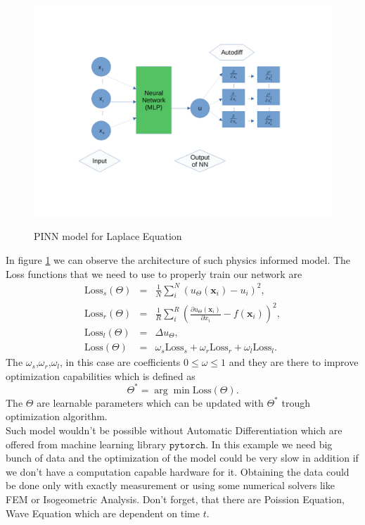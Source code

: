 \begin{figure}[h!]
	\includegraphics[width=15cm]{chapters/chapter1/pinn}
	\label{pinn}
	\caption{PINN model for Laplace Equation}
\end{figure}
In figure \ref{pinn} we can observe the architecture of such physics informed model. 
The Loss functions that we need to use to properly train our network are
\begin{eqnarray}
	\text{Loss}_s(\Theta) &=& \frac{1}{N}\sum^N_i\left(u_{\Theta}(\mathbf{x}_i)- u_i\right)^2,\\
	\text{Loss}_r(\Theta) &=& \frac{1}{R}\sum^R_i\left(\frac{\partial u_{\Theta}(\mathbf{x}_i)}{\partial x_i} - f(\mathbf{x}_i)\right)^2,\\
	\text{Loss}_l(\Theta) &=& \Delta u_{\Theta},\\
	\text{Loss}(\Theta) &=& \omega_s \text{Loss}_s +\omega_r \text{Loss}_r +\omega_l \text{Loss}_l .
\end{eqnarray}
The $\omega_s$,$\omega_r$,$\omega_l$, in this case are coefficients $0\leq \omega \leq 1$ and they are there to improve optimization capabilities which is defined as
\begin{equation}
	\Theta^* = \arg\min\text{Loss}(\Theta).
\end{equation}
The $\Theta$ are learnable parameters which can be updated with $\Theta^*$ trough optimization algorithm.\\
Such model wouldn't be possible without Automatic Differentiation\cite{} which are offered from machine learning library $\texttt{pytorch}$\cite{}. In this example we need big bunch of data and the optimization of the model could be very slow in addition if we don't have a computation capable hardware for it. Obtaining the data could be done only with exactly measurement or using some numerical solvers like FEM or Isogeometric Analysis. Don't forget, that there are Poission Equation, Wave Equation which are dependent on time $t$.\\
